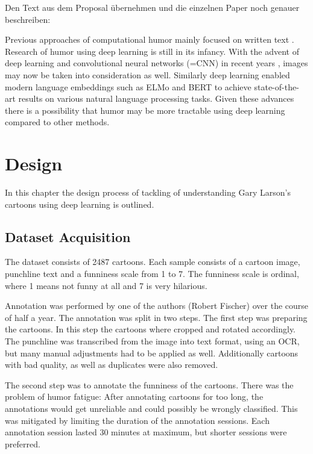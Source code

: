 \documentclass[draft,final,oneside]{vutinfth} %
\begin{document}
Den Text aus dem Proposal übernehmen und die einzelnen Paper noch genauer beschreiben:

Previous approaches of computational humor mainly focused on written text \cite{Yang2015HumorRA}\cite{Bamman2015ContextualizedSD}\cite{HumoristBot}. Research of humor using deep learning is still in its infancy. With the advent of deep learning and convolutional neural networks (=CNN) in recent years \cite{Druzhkov2016}, images may now be taken into consideration as well. Similarly deep learning enabled modern language embeddings such as ELMo \cite{elmo} and BERT \cite{bert} to achieve state-of-the-art results on various natural language processing tasks. Given these advances there is a possibility that humor may be more tractable using deep learning compared to other methods.


\chapter{Design} \label{design}

In this chapter the design process of tackling of understanding Gary Larson's cartoons using deep learning is outlined.


\section{Dataset Acquisition}
The dataset consists of 2487 cartoons. Each sample consists of a cartoon image, punchline text and a funniness scale from 1 to 7. The funniness scale is ordinal, where 1 means not funny at all and 7 is very hilarious.

Annotation was performed by one of the authors (Robert Fischer) over the course of half a year. The annotation was split in two steps. The first step was preparing the cartoons. In this step the cartoons where cropped and rotated accordingly. The punchline was transcribed from the image into text format, using an OCR, but many manual adjustments had to be applied as well. Additionally cartoons with bad quality, as well as duplicates were also removed.

The second step was to annotate the funniness of the cartoons. There was the problem of humor fatigue: After annotating cartoons for too long, the annotations would get unreliable and could possibly be wrongly classified. This was mitigated by limiting the duration of the annotation sessions. Each annotation session lasted 30 minutes at maximum, but shorter sessions were preferred. 
\end{document}
